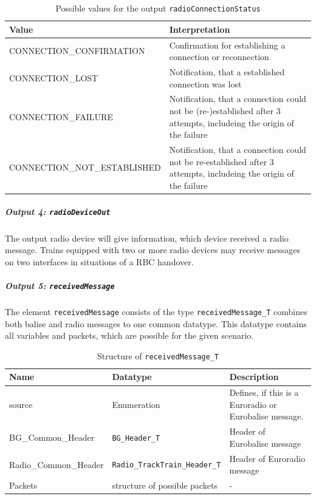 \documentclass{template/openetcs_report}
\begin{document}
\begin{table}[H]
  \begin{tabular}{| l | p{9cm} |}
    \hline
    \textbf{Value} & \textbf{Interpretation}\\ \hline
    CONNECTION\_CONFIRMATION & Confirmation for establishing a connection or reconnection\\
    CONNECTION\_LOST & Notification, that a established connection was lost\\
    CONNECTION\_FAILURE & Notification, that a connection could not be (re-)established after 3 attempts, includeing the origin of the failure\\
    
    CONNECTION\_NOT\_ESTABLISHED &  Notification, that a connection could not be re-established after 3 attempts, includeing the origin of the failure\\
    \hline
  \end{tabular} 
  \caption{Possible values for the output \texttt{radioConnectionStatus}}
  \label{tbl:ConnectionStatusOutput}
\end{table}

\subparagraph{Output 4: \texttt{radioDeviceOut}}
The output radio device will give information, which device received a radio message. Trains equipped with two or more radio devices may receive messages on two interfaces in situations of a RBC handover.

\subparagraph{Output 5: \texttt{receivedMessage}}
The element \texttt{receivedMessage} consists of the type \texttt{receivedMessage\_T} combines both balise and radio messages to one common datatype. This datatype contains all variables and packets, which are possible for the given scenario.

\begin{table}[H]
  \begin{tabular}{| l | l | p{5.5cm} |}
  \hline
  \textbf{Name} & \textbf{Datatype} & \textbf{Description}\\ \hline
  source & Enumeration & Defines, if this is a Euroradio or Eurobalise message.\\
  BG\_Common\_Header & \texttt{BG\_Header\_T} & Header of Eurobalise message\\
  Radio\_Common\_Header & \texttt{Radio\_TrackTrain\_Header\_T} & Header of Euroradio message\\
  Packets & structure of possible packets & -\\
  
  \hline
\end{tabular}
  \caption{Structure of \texttt{receivedMessage\_T}}
  \label{tbl:receivedMessage_structure}
\end{table}
\end{document}
